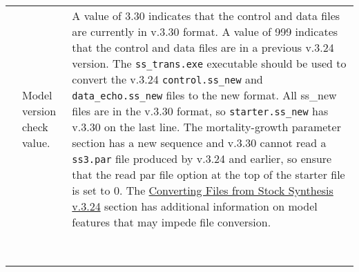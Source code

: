 {\begin{landscape}
\begin{longtable}{p{1.5cm} p{7.2cm} p{12.3cm}}
 \pagebreak
 \raisebox{0.1\ht\strutbox}{\hypertarget{Convert}{3.30}} & Model version check value. & \multirow{1}{1cm}[-0.25cm]{\parbox{12.5cm}{A value of 3.30 indicates that the control and data files are currently in v.3.30 format. A value of 999 indicates that the control and data files are in a previous v.3.24 version. The \texttt{\texttt{ss\_trans.exe}} executable should be used to convert the v.3.24 \texttt{\texttt{control.ss\_new}} and \texttt{\texttt{data\_echo.ss\_new}} files to the new format. All ss\_new files are in the v.3.30 format, so \texttt{\texttt{starter.ss\_new}} has v.3.30 on the last line. The mortality-growth parameter section has a new sequence and v.3.30 cannot read a \texttt{\texttt{ss3.par}} file produced by v.3.24 and earlier, so ensure that the read par file option at the top of the starter file is set to 0. The \hyperlink{ConvIssues}{Converting Files from Stock Synthesis v.3.24} section has additional information on model features that may impede file conversion.}} \Tstrut\Bstrut\\
     & & \\  
     & & \\  
	   & & \\
     & & \\
   	 & & \\
     & & \\  
     & & \\  
     & & \\

\end{longtable}
\end{landscape}
}
\restoregeometry





\pagebreak
